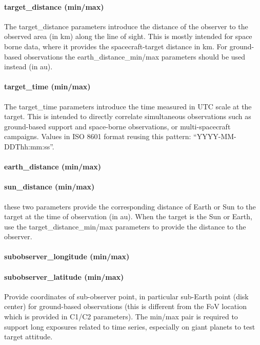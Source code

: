 \documentclass[11pt,a4paper]{ivoa}
\begin{document}
\paragraph{target\_distance (min/max)}

The target\_distance parameters introduce the distance of the observer to the observed area (in km) along the line of sight. This is mostly intended for space borne data, where it provides the spacecraft-target distance in km. For ground-based observations the earth\_distance\_min/max parameters should be used instead (in au).

\paragraph{target\_time (min/max)}

The target\_time parameters introduce the time measured in UTC scale at the target. This is intended to directly correlate simultaneous observations such as ground-based support and space-borne observations, or multi-spacecraft campaigns. Values in ISO 8601 format reusing this pattern: “YYYY-MM-DDThh:mm:ss”. 

\paragraph{earth\_distance (min/max)}

\paragraph{sun\_distance (min/max)}

these two parameters provide the corresponding distance of Earth or Sun to the target at the time of observation (in au). When the target is the Sun or Earth, use the target\_distance\_min/max parameters to provide the distance to the observer.

\paragraph{subobserver\_longitude (min/max)}

\paragraph{subobserver\_latitude (min/max)}

Provide coordinates of sub-observer point, in particular sub-Earth point (disk center) for ground-based observations (this is different from the FoV location which is provided in C1/C2 parameters). The min/max pair is required to support long exposures related to time series, especially on giant planets to test target attitude.
\end{document}

